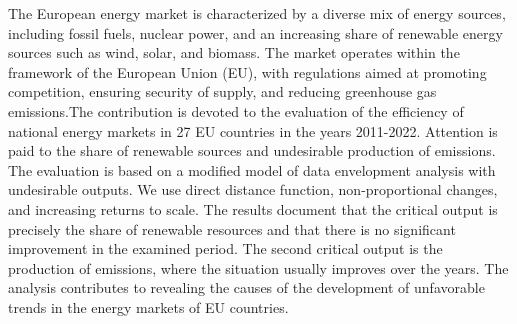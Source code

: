 
\begin{Abstrakt}
    The European energy market is characterized by a diverse mix of energy sources, including fossil fuels, nuclear power, and an increasing share of renewable energy sources such as wind, solar, and biomass. The market operates within the framework of the European Union (EU), with regulations aimed at promoting competition, ensuring security of supply, and reducing greenhouse gas emissions.\newline The contribution is devoted to the evaluation of the efficiency of national energy markets in 27 EU countries in the years 2011-2022. Attention is paid to the share of renewable sources and undesirable production of emissions. The evaluation is based on a modified model of data envelopment analysis with undesirable outputs. We use direct distance function, non-proportional changes, and increasing returns to scale. The results document that the critical output is precisely the share of renewable resources and that there is no significant improvement in the examined period. The second critical output is the production of emissions, where the situation usually improves over the years. The analysis contributes to revealing the causes of the development of unfavorable trends in the energy markets of EU countries.
\end{Abstrakt}



\clearpage